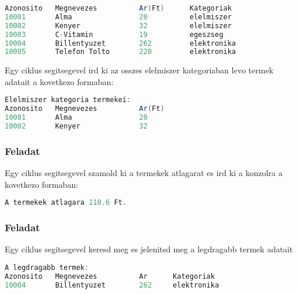 \documentclass{article}
\begin{document}
\begin{lstlisting}[language=Java, caption=Feladat]
Azonosito   Megnevezes          Ar(Ft)      Kategoriak
10001       Alma                20          elelmiszer
10002       Kenyer              32          elelmiszer
10003       C-Vitamin           19          egeszseg
10004       Billentyuzet        262         elektronika
10005       Telefon Tolto       220         elektronika
\end{lstlisting}

Egy ciklus segitsegevel ird ki az osszes elelmiszer kategoriaban levo termek adatait a kovetkezo formaban:

\begin{lstlisting}[language=Java, caption=Feladat]
Elelmiszer kategoria termekei:
Azonosito   Megnevezes          Ar(Ft)
10001       Alma                20
10002       Kenyer              32
\end{lstlisting}

\subsubsection{Feladat}

Egy ciklus segitsegevel szamold ki a termekek atlagarat es ird ki a konzolra a kovetkezo formaban:

\begin{lstlisting}[language=Java, caption=Feladat]
A termekek atlagara 110.6 Ft.
\end{lstlisting}

\subsubsection{Feladat}

Egy ciklus segitsegevel keresd meg es jelenitsd meg a legdragabb termek adatait

\begin{lstlisting}[language=Java, caption=Feladat]
A legdragabb termek:
Azonosito   Megnevezes          Ar      Kategoriak
10004       Billentyuzet        262     elektronika
\end{lstlisting}
\end{document}
